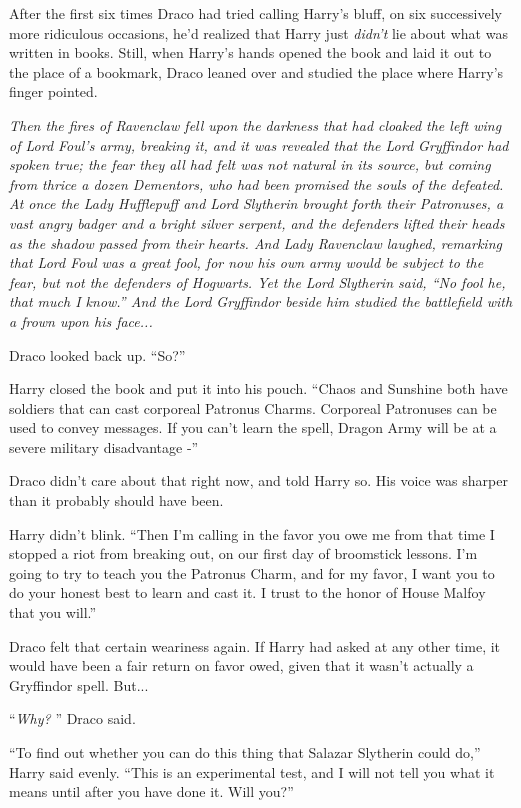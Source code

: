 After the first six times Draco had tried calling Harry's bluff, on six
successively more ridiculous occasions, he'd realized that Harry just
\emph{didn't} lie about what was written in books. Still, when Harry's
hands opened the book and laid it out to the place of a bookmark, Draco
leaned over and studied the place where Harry's finger pointed.

\emph{Then the fires of Ravenclaw fell upon the darkness that had
cloaked the left wing of Lord Foul's army, breaking it, and it was
revealed that the Lord Gryffindor had spoken true; the fear they all had
felt was not natural in its source, but coming from thrice a dozen
Dementors, who had been promised the souls of the defeated. At once the
Lady Hufflepuff and Lord Slytherin brought forth their Patronuses, a
vast angry badger and a bright silver serpent, and the defenders lifted
their heads as the shadow passed from their hearts. And Lady Ravenclaw
laughed, remarking that Lord Foul was a great fool, for now his own army
would be subject to the fear, but not the defenders of Hogwarts. Yet the
Lord Slytherin said, ``No fool he, that much I know.'' And the Lord
Gryffindor beside him studied the battlefield with a frown upon his
face...}

Draco looked back up. ``So?''

Harry closed the book and put it into his pouch. ``Chaos and Sunshine
both have soldiers that can cast corporeal Patronus Charms. Corporeal
Patronuses can be used to convey messages. If you can't learn the spell,
Dragon Army will be at a severe military disadvantage -''

Draco didn't care about that right now, and told Harry so. His voice was
sharper than it probably should have been.

Harry didn't blink. ``Then I'm calling in the favor you owe me from that
time I stopped a riot from breaking out, on our first day of broomstick
lessons. I'm going to try to teach you the Patronus Charm, and for my
favor, I want you to do your honest best to learn and cast it. I trust
to the honor of House Malfoy that you will.''

Draco felt that certain weariness again. If Harry had asked at any other
time, it would have been a fair return on favor owed, given that it
wasn't actually a Gryffindor spell. But...

``\emph{Why?} '' Draco said.

``To find out whether you can do this thing that Salazar Slytherin could
do,'' Harry said evenly. ``This is an experimental test, and I will not
tell you what it means until after you have done it. Will you?''

